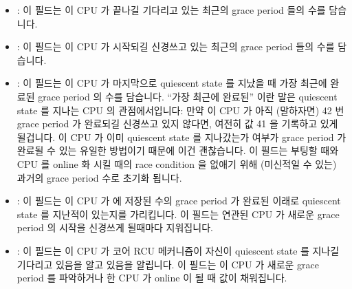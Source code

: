 \begin{itemize}
\item	{}:
	이 필드는 이 CPU 가 끝나길 기다리고 있는 최근의 grace period 들의 수를
	담습니다.
\item	{}:
	이 필드는 이 CPU 가 시작되길 신경쓰고 있는 최근의 grace period 들의
	수를 담습니다.
\item	{}:
	이 필드는 이 CPU 가 마지막으로 quiescent state 를 지났을 때 가장 최근에
	완료된 grace period 의 수를 담습니다.
	``가장 최근에 완료된'' 이란 말은 quiescent state 를 지나는 CPU 의
	관점에서입니다: 만약 이 CPU 가 아직 (말하자면) 42 번 grace period 가
	완료되길 신경쓰고 있지 않다면, 여전히 값 41 을 기록하고 있게 될겁니다.
	이 CPU 가 이미 quiescent state 를 지나갔는가 여부가 grace period 가
	완료될 수 있는 유일한 방법이기 때문에 이건 괜찮습니다.
	이 필드는 부팅할 때와 CPU 를 online 화 시킬 때의 race condition 을
	없애기 위해 (미신적일 수 있는) 과거의 grace period 수로 초기화 됩니다.
\iffalse

\item	\co{completed}:
	This field contains the number of the most recent grace period
	that this CPU is aware of having completed.
\item	\co{gpnum}:
	This field contains the number of the most recent grace period
	that this CPU is aware of having started.
\item	\co{passed_quiesc_completed}:
	This field contains the number of the grace period that had most
	recently completed when this
	CPU last passed through a quiescent state.
	The ``most recently completed'' will be from the viewpoint of
	the CPU passing through the quiescent state: if the CPU is
	not yet aware that grace period (say) 42 has completed, it
	will still record the old value of 41.
	This is OK, because the only way that the grace period can
	complete is if this CPU has already passed through a
	quiescent state.
	This field is initialized to a (possibly mythical) past
	grace period number to avoid race conditions when booting
	and when onlining a CPU.
\fi
\item	{}:
	이 필드는 이 CPU 가  에 저장된 수의 grace
	period 가 완료된 이래로 quiescent state 를 지난적이 있는지를
	가리킵니다.
	이 필드는 연관된 CPU 가 새로운 grace period 의 시작을 신경쓰게 될때마다
	지워집니다.
\item	{}:
	이 필드는 이 CPU 가 코어 RCU 메커니즘이 자신이 quiescent state 를
	지나길 기다리고 있음을 알고 있음을 알립니다.
	이 필드는 이 CPU 가 새로운 grace period 를 파악하거나 한 CPU 가 online
	이 될 때 값이 채워집니다.
\iffalse


\end{itemize}
